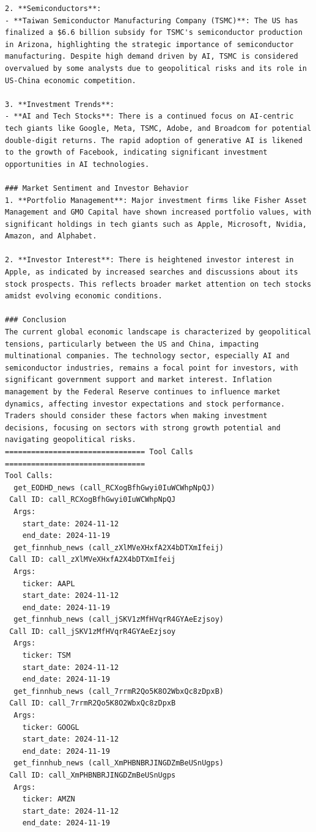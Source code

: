 \begin{tcolorbox}
\begin{lstlisting}[style=agentbase]
2. **Semiconductors**:
- **Taiwan Semiconductor Manufacturing Company (TSMC)**: The US has finalized a $6.6 billion subsidy for TSMC's semiconductor production in Arizona, highlighting the strategic importance of semiconductor manufacturing. Despite high demand driven by AI, TSMC is considered overvalued by some analysts due to geopolitical risks and its role in US-China economic competition.

3. **Investment Trends**:
- **AI and Tech Stocks**: There is a continued focus on AI-centric tech giants like Google, Meta, TSMC, Adobe, and Broadcom for potential double-digit returns. The rapid adoption of generative AI is likened to the growth of Facebook, indicating significant investment opportunities in AI technologies.

### Market Sentiment and Investor Behavior
1. **Portfolio Management**: Major investment firms like Fisher Asset Management and GMO Capital have shown increased portfolio values, with significant holdings in tech giants such as Apple, Microsoft, Nvidia, Amazon, and Alphabet.

2. **Investor Interest**: There is heightened investor interest in Apple, as indicated by increased searches and discussions about its stock prospects. This reflects broader market attention on tech stocks amidst evolving economic conditions.

### Conclusion
The current global economic landscape is characterized by geopolitical tensions, particularly between the US and China, impacting multinational companies. The technology sector, especially AI and semiconductor industries, remains a focal point for investors, with significant government support and market interest. Inflation management by the Federal Reserve continues to influence market dynamics, affecting investor expectations and stock performance. Traders should consider these factors when making investment decisions, focusing on sectors with strong growth potential and navigating geopolitical risks.
================================ Tool Calls ================================
Tool Calls:
  get_EODHD_news (call_RCXogBfhGwyi0IuWCWhpNpQJ)
 Call ID: call_RCXogBfhGwyi0IuWCWhpNpQJ
  Args:
    start_date: 2024-11-12
    end_date: 2024-11-19
  get_finnhub_news (call_zXlMVeXHxfA2X4bDTXmIfeij)
 Call ID: call_zXlMVeXHxfA2X4bDTXmIfeij
  Args:
    ticker: AAPL
    start_date: 2024-11-12
    end_date: 2024-11-19
  get_finnhub_news (call_jSKV1zMfHVqrR4GYAeEzjsoy)
 Call ID: call_jSKV1zMfHVqrR4GYAeEzjsoy
  Args:
    ticker: TSM
    start_date: 2024-11-12
    end_date: 2024-11-19
  get_finnhub_news (call_7rrmR2Qo5K8O2WbxQc8zDpxB)
 Call ID: call_7rrmR2Qo5K8O2WbxQc8zDpxB
  Args:
    ticker: GOOGL
    start_date: 2024-11-12
    end_date: 2024-11-19
  get_finnhub_news (call_XmPHBNBRJINGDZmBeUSnUgps)
 Call ID: call_XmPHBNBRJINGDZmBeUSnUgps
  Args:
    ticker: AMZN
    start_date: 2024-11-12
    end_date: 2024-11-19
\end{lstlisting}
\end{tcolorbox}

